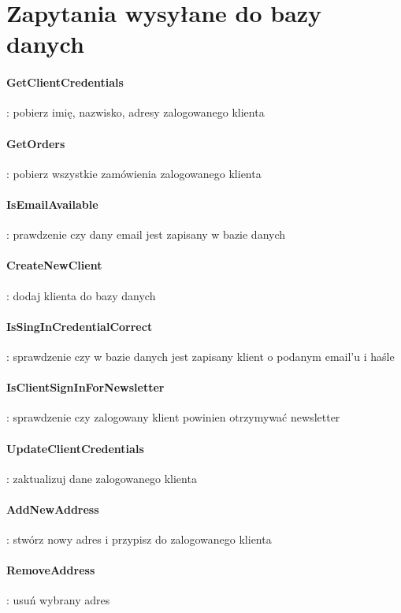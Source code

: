 \documentclass[12pt]{report}
\begin{document}
	\section{Zapytania wysyłane do bazy danych}
	
	\paragraph{GetClientCredentials} : pobierz imię, nazwisko, adresy zalogowanego klienta
	
	\paragraph{GetOrders} : pobierz wszystkie zamówienia zalogowanego klienta 
	
	\paragraph{IsEmailAvailable} : prawdzenie czy dany email jest zapisany w bazie danych
	
	\paragraph{CreateNewClient} : dodaj klienta do bazy danych 
	
	\paragraph{IsSingInCredentialCorrect} : sprawdzenie czy w bazie danych jest zapisany klient o podanym email’u i haśle
	
	\paragraph{IsClientSignInForNewsletter} : sprawdzenie czy zalogowany klient powinien otrzymywać newsletter
	
	\paragraph{UpdateClientCredentials} : zaktualizuj dane zalogowanego klienta
	
	\paragraph{AddNewAddress} : stwórz nowy adres i przypisz do zalogowanego klienta
	
	\paragraph{RemoveAddress} : usuń wybrany adres
	
\end{document}
